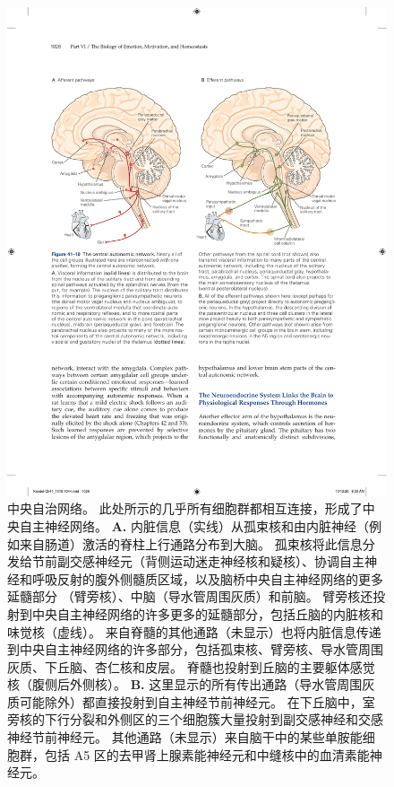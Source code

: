 \begin{figure}[htbp]
	\centering
	\includegraphics[width=0.95\linewidth]{chap41/fig_41_10}
	\caption{中央自治网络。
		此处所示的几乎所有细胞群都相互连接，形成了中央自主神经网络。
		\textbf{A.} 内脏信息（实线）从孤束核和由内脏神经（例如来自肠道）激活的脊柱上行通路分布到大脑。
		孤束核将此信息分发给节前副交感神经元（背侧运动迷走神经核和疑核）、协调自主神经和呼吸反射的腹外侧髓质区域，以及脑桥中央自主神经网络的更多延髓部分 （臂旁核）、中脑（导水管周围灰质）和前脑。
		臂旁核还投射到中央自主神经网络的许多更多的延髓部分，包括丘脑的内脏核和味觉核（虚线）。
		来自脊髓的其他通路（未显示）也将内脏信息传递到中央自主神经网络的许多部分，包括孤束核、臂旁核、导水管周围灰质、下丘脑、杏仁核和皮层。
		脊髓也投射到丘脑的主要躯体感觉核（腹侧后外侧核）。
		\textbf{B.} 这里显示的所有传出通路（导水管周围灰质可能除外）都直接投射到自主神经节前神经元。
		在下丘脑中，室旁核的下行分裂和外侧区的三个细胞簇大量投射到副交感神经和交感神经节前神经元。
		其他通路（未显示）来自脑干中的某些单胺能细胞群，包括 A5 区的去甲肾上腺素能神经元和中缝核中的血清素能神经元。}
	\label{fig:41_10}
\end{figure}


